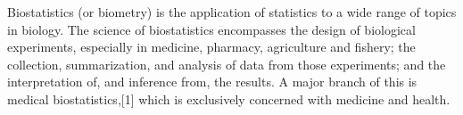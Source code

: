 Biostatistics (or biometry) is the application of statistics to a wide range of topics in biology. The science of biostatistics encompasses the design of biological experiments, especially in medicine, pharmacy, agriculture and fishery; the collection, summarization, and analysis of data from those experiments; and the interpretation of, and inference from, the results. A major branch of this is medical biostatistics,[1] which is exclusively concerned with medicine and health.
